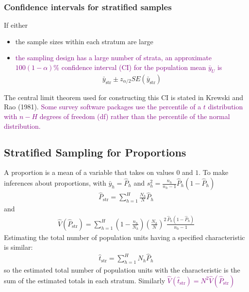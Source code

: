 \documentclass[a4paper,twoside,11pt]{article}
\begin{document}
\subsubsection{Confidence intervals for stratified samples}
If either 
\begin{itemize}
    \item the sample sizes within each stratum are large
    \item \textcolor{Purple}{the sampling design has a large number of strata, an approximate $100(1-\alpha)\%$ confidence interval (CI) for the population mean $\bar{y}_U$ is}
\newline
\begin{equation*}
\begin{aligned}
\bar{y}_{\text{str}} \pm z_{\alpha/2} SE(\bar{y}_{\text{str}})
\end{aligned}
\end{equation*}
\end{itemize}
The central limit theorem used for constructing this CI is stated in Krewski and Rao (1981). \textcolor{Purple}{Some survey software packages use the percentile of a $t$ distribution with $n-H$ degrees of freedom (df) rather than the percentile of the normal distribution.}
\subsection{Stratified Sampling for Proportions}
A proportion is a mean of a variable that takes on values $0$ and $1$. To make inferences about proportions, with $\bar{y}_h = \hat{P}_h$ and $s_h^2 = \frac{n_h}{n_h -1}\hat{P}_h (1-\hat{P}_h)$
\begin{equation*}
\begin{aligned}
\hat{P}_{\text{str}} = \sum^H_{h=1} \frac{N_h}{N}\hat{P}_h
\end{aligned}
\end{equation*}
and 
\begin{equation*}
\begin{aligned}
\hat{V}(\hat{P}_{\text{str}}) = \sum^H_{h=1}(1-\frac{n_h}{N_h}) (\frac{N_h}{N})^2 \frac{\hat{P}_h (1-\hat{P}_h)}{n_h -1}
\end{aligned}
\end{equation*}
Estimating the total number of population units having a specified characteristic is similar:
\begin{equation*}
\begin{aligned}
\hat{t}_{\text{str}} = \sum^H_{h=1} N_h \hat{P}_h
\end{aligned}
\end{equation*}
so the estimated total number of population units with the characteristic is the sum of the estimated totals in each stratum. Similarly \textcolor{Purple}{$\hat{V}(\hat{t}_{\text{str}}) = N^2 \hat{V}(\hat{P}_{\text{str}})$}
\end{document}
